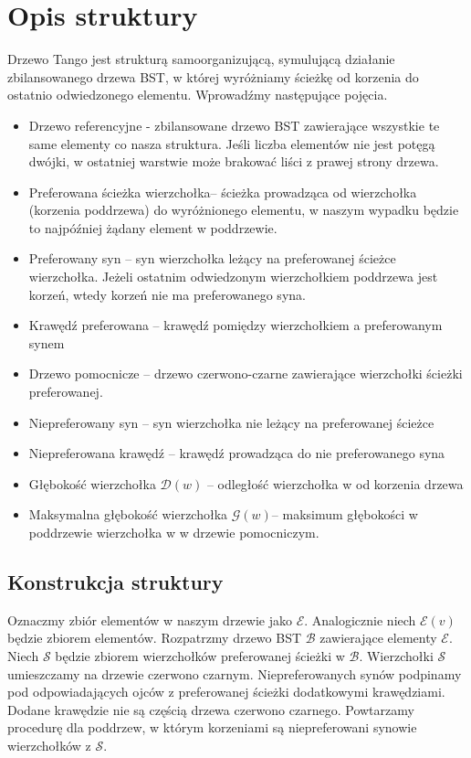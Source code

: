 \documentclass[declaration,shortabstract]{iithesis}
\theoremstyle{thm}
\theoremstyle{remark}
\theoremstyle{plain}
\theoremstyle{plain}
\theoremstyle{plain}
\begin{document}
 \section{Opis struktury} 
Drzewo Tango jest strukturą samoorganizującą, symulującą działanie zbilansowanego drzewa BST, w której wyróżniamy ścieżkę od korzenia do ostatnio odwiedzonego elementu.  Wprowadźmy następujące pojęcia. 
 \begin{itemize} 
 \item{Drzewo referencyjne - zbilansowane drzewo BST zawierające wszystkie te same elementy co nasza struktura. Jeśli liczba elementów nie jest potęgą dwójki, w ostatniej warstwie może brakować liści z prawej strony drzewa.} 
 \item{Preferowana ścieżka wierzchołka– ścieżka prowadząca od wierzchołka (korzenia poddrzewa) do wyróżnionego elementu, w naszym wypadku będzie to najpóźniej  żądany element w poddrzewie.} 
 \item{Preferowany syn – syn wierzchołka leżący na preferowanej ścieżce wierzchołka. Jeżeli ostatnim odwiedzonym wierzchołkiem poddrzewa jest korzeń, wtedy korzeń nie ma preferowanego syna.} 
 \item{Krawędź preferowana – krawędź pomiędzy wierzchołkiem a preferowanym synem} \item{Drzewo pomocnicze -- drzewo czerwono-czarne zawierające wierzchołki ścieżki preferowanej.} 
 \item{Niepreferowany syn – syn wierzchołka nie leżący na preferowanej ścieżce} \item{Niepreferowana krawędź – krawędź prowadząca do nie preferowanego syna} \item{Głębokość wierzchołka \(\mathcal{D}(w)\) -- odległość wierzchołka w od korzenia drzewa} \item{Maksymalna głębokość wierzchołka \(\mathcal{G}(w)\)-- maksimum głębokości w poddrzewie wierzchołka w w drzewie pomocniczym.} 
 \end{itemize} 
 \subsection{Konstrukcja struktury}  

Oznaczmy zbiór elementów w naszym drzewie jako \(\mathcal{E}\). Analogicznie niech \(\mathcal{E}(v)\) będzie zbiorem elementów. Rozpatrzmy drzewo BST \(\mathcal{B}\) zawierające elementy \(\mathcal{E}\). Niech \( \mathcal{S}\) będzie zbiorem wierzchołków preferowanej ścieżki w \(\mathcal{B}\). Wierzchołki \(\mathcal{S}\) umieszczamy na drzewie czerwono czarnym. Niepreferowanych synów podpinamy pod odpowiadających ojców z preferowanej ścieżki dodatkowymi krawędziami. Dodane krawędzie nie są częścią drzewa czerwono czarnego. Powtarzamy procedurę dla poddrzew, w którym korzeniami są niepreferowani synowie wierzchołków z \(\mathcal{S}\).  
\end{document}
